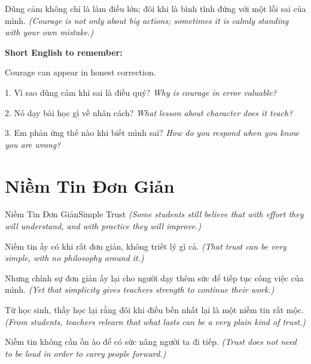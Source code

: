 \begin{baihoc}
Dũng cảm không chỉ là làm điều lớn; đôi khi là bình tĩnh đứng với một lỗi sai của mình.
\textit{(Courage is not only about big actions; sometimes it is calmly standing with your own mistake.)}
\end{baihoc}

\begin{ghinhoanh}
\textbf{Short English to remember:}

Courage can appear in honest correction.

\end{ghinhoanh}

\begin{tuhocnhanh}
1. Vì sao dũng cảm khi sai là điều quý? \textit{Why is courage in error valuable?}

2. Nó dạy bài học gì về nhân cách? \textit{What lesson about character does it teach?}

3. Em phản ứng thế nào khi biết mình sai? \textit{How do you respond when you know you are wrong?}
\end{tuhocnhanh}
\ngancach

\section{Niềm Tin Đơn Giản}
\begin{truyen}{Niềm Tin Đơn Giản}{Simple Trust}
\textit{(Some students still believe that with effort they will understand, and with practice they will improve.)}

Niềm tin ấy có khi rất đơn giản, không triết lý gì cả.
\textit{(That trust can be very simple, with no philosophy around it.)}

Nhưng chính sự đơn giản ấy lại cho người dạy thêm sức để tiếp tục công việc của mình.
\textit{(Yet that simplicity gives teachers strength to continue their work.)}

Từ học sinh, thầy học lại rằng đôi khi điều bền nhất lại là một niềm tin rất mộc.
\textit{(From students, teachers relearn that what lasts can be a very plain kind of trust.)}
\end{truyen}

\begin{baihoc}
Niềm tin không cần ồn ào để có sức nâng người ta đi tiếp.
\textit{(Trust does not need to be loud in order to carry people forward.)}
\end{baihoc}

